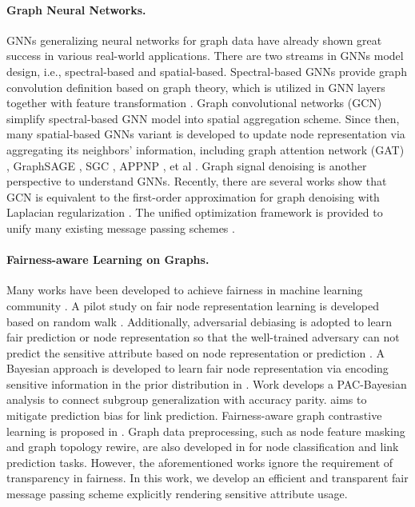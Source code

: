 \documentclass[letterpaper]{article} %
\theoremstyle{plain}
\theoremstyle{definition}
\theoremstyle{remark}
\begin{document}
\paragraph{Graph Neural Networks.} GNNs generalizing neural networks for graph data have already shown great success in various real-world applications. There are two streams in GNNs model design, i.e., spectral-based and spatial-based. Spectral-based GNNs provide graph convolution definition based on graph theory, which is utilized in GNN layers together with feature transformation \citep{bruna2013spectral,defferrard2016convolutional,henaff2015deep}. Graph convolutional networks (GCN) \citep{kipf2017semi} simplify spectral-based GNN model into spatial aggregation scheme. Since then, many spatial-based GNNs variant is developed to update node representation via aggregating its neighbors' information, including graph attention network (GAT) \citep{velivckovic2018graph},  GraphSAGE \citep{hamilton2017inductive}, SGC \citep{wu2019simplifying}, APPNP \citep{klicpera2019predict}, et al \citep{gao2018large,monti2017geometric}. Graph signal denoising is another perspective to understand GNNs. Recently, there are several works show that GCN is equivalent to the first-order approximation for graph denoising with Laplacian regularization \citep{henaff2015deep,zhao2019pairnorm}. The unified optimization framework is provided to unify many existing message passing schemes \citep{ma2021unified,zhu2021interpreting}. 

\paragraph{Fairness-aware Learning on Graphs.} Many works have been developed to achieve fairness in machine learning community \citep{jiang2022generalized,han2023retiring,jiang2023weight, chuang2020fair,zhang2018mitigating,du2021fairness,yurochkin2020sensei,creager2019flexibly,feldman2015certifying}. A pilot study on fair node representation learning is developed based on random walk \citep{rahman2019fairwalk}. Additionally, adversarial debiasing is adopted to learn fair prediction or node representation so that the well-trained adversary can not predict the sensitive attribute based on node representation or prediction \citep{dai2021say,bose2019compositional,fisher2020debiasing}. A Bayesian approach is developed to learn fair node representation via encoding sensitive information in the prior distribution in \citep{buyl2020debayes}. Work \citep{ma2021subgroup} develops a PAC-Bayesian analysis to connect subgroup generalization with accuracy parity. \citep{laclau2021all,li2021dyadic} aims to mitigate prediction bias for link prediction. Fairness-aware graph contrastive learning is proposed in \citep{agarwal2021towards,kose2021fairness,ling2023learning}. Graph data preprocessing, such as node feature masking and graph topology rewire, are also developed in \citep{laclau2021all,li2021dyadic,dong2021individual,wang2022improving,zha2023data} for node classification and link prediction tasks. However, the aforementioned works ignore the requirement of transparency in fairness. In this work, we develop an efficient and transparent fair message passing scheme explicitly rendering sensitive attribute usage. 
\end{document}
